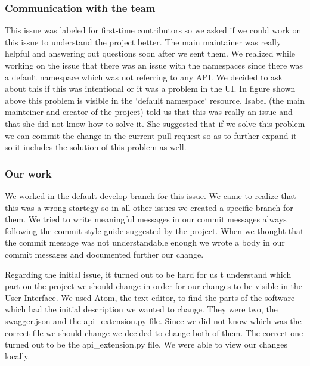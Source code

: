 \documentclass{article}
\begin{document}
\vfill
\clearpage
\subsubsection{Communication with the team}										
\hspace{0.5cm}This issue was labeled for first-time contributors so we asked if we could work on this issue to understand the project better. The main maintainer was really helpful and answering out questions soon after we sent them. We realized while working on the issue that there was an issue with the namespaces since there was a default namespace which was not referring to any API. We decided to ask about this if this was intentional or it was a problem in the UI. In figure shown above this problem is visible in the `default namespace` resource. Isabel (the main mainteiner and creator of the project) told us that this was really an issue and that she did not know how to solve it. She suggested that if we solve this problem we can commit the change in the current pull request so as to further expand it so it includes the solution of this problem as well.

\subsubsection{Our work}

\hspace{0.5cm}We worked in the default develop branch for this issue. We came to realize that this was a wrong startegy so in all other issues we created a specific branch for them. We tried to write meaningful messages in our commit messages always following the commit style guide suggested by the project. When we thought that the commit message was not understandable enough we wrote a body in our commit messages and documented further our change.

Regarding the initial issue, it turned out to be hard for us t understand which part on the project we should change in order for our changes to be visible in the User Interface. We used Atom, the text editor, to find the parts of the software which had the initial description we wanted to change. They were two, the swagger.json and the api\_extension.py file. Since we did not know which was the correct file we should change we decided to change both of them. The correct one turned out to be the api\_extension.py file. We were able to view our changes locally.
\end{document}
